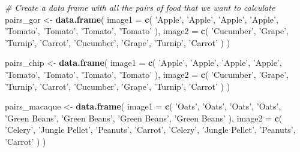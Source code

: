 \documentclass[
]{book}
\newenvironment{Shaded}{\begin{snugshade}}{\end{snugshade}}
\newcommand{\CommentTok}[1]{\textcolor[rgb]{0.56,0.35,0.01}{\textit{#1}}}
\newcommand{\DataTypeTok}[1]{\textcolor[rgb]{0.13,0.29,0.53}{#1}}
\newcommand{\KeywordTok}[1]{\textcolor[rgb]{0.13,0.29,0.53}{\textbf{#1}}}
\newcommand{\NormalTok}[1]{#1}
\newcommand{\StringTok}[1]{\textcolor[rgb]{0.31,0.60,0.02}{#1}}
\begin{document}
\begin{Shaded}
\begin{Highlighting}[]
\CommentTok{# Create a data frame with all the pairs of food that we want to calculate}
\NormalTok{pairs_gor <-}
\StringTok{  }\KeywordTok{data.frame}\NormalTok{(}
    \DataTypeTok{image1 =} \KeywordTok{c}\NormalTok{(}
      \StringTok{'Apple'}\NormalTok{,}
      \StringTok{'Apple'}\NormalTok{,}
      \StringTok{'Apple'}\NormalTok{,}
      \StringTok{'Apple'}\NormalTok{,}
      \StringTok{'Tomato'}\NormalTok{,}
      \StringTok{'Tomato'}\NormalTok{,}
      \StringTok{'Tomato'}\NormalTok{,}
      \StringTok{'Tomato'}
\NormalTok{    ),}
    \DataTypeTok{image2 =} \KeywordTok{c}\NormalTok{(}
      \StringTok{'Cucumber'}\NormalTok{,}
      \StringTok{'Grape'}\NormalTok{,}
      \StringTok{'Turnip'}\NormalTok{,}
      \StringTok{'Carrot'}\NormalTok{,}
      \StringTok{'Cucumber'}\NormalTok{,}
      \StringTok{'Grape'}\NormalTok{,}
      \StringTok{'Turnip'}\NormalTok{,}
      \StringTok{'Carrot'}
\NormalTok{    )}
\NormalTok{  )}

\NormalTok{pairs_chip <-}
\StringTok{  }\KeywordTok{data.frame}\NormalTok{(}
    \DataTypeTok{image1 =} \KeywordTok{c}\NormalTok{(}
      \StringTok{'Apple'}\NormalTok{,}
      \StringTok{'Apple'}\NormalTok{,}
      \StringTok{'Apple'}\NormalTok{,}
      \StringTok{'Apple'}\NormalTok{,}
      \StringTok{'Tomato'}\NormalTok{,}
      \StringTok{'Tomato'}\NormalTok{,}
      \StringTok{'Tomato'}\NormalTok{,}
      \StringTok{'Tomato'}
\NormalTok{    ),}
    \DataTypeTok{image2 =} \KeywordTok{c}\NormalTok{(}
      \StringTok{'Cucumber'}\NormalTok{,}
      \StringTok{'Grape'}\NormalTok{,}
      \StringTok{'Turnip'}\NormalTok{,}
      \StringTok{'Carrot'}\NormalTok{,}
      \StringTok{'Cucumber'}\NormalTok{,}
      \StringTok{'Grape'}\NormalTok{,}
      \StringTok{'Turnip'}\NormalTok{,}
      \StringTok{'Carrot'}
\NormalTok{    )}
\NormalTok{  )}


\NormalTok{pairs_macaque <-}
\StringTok{  }\KeywordTok{data.frame}\NormalTok{(}
    \DataTypeTok{image1 =} \KeywordTok{c}\NormalTok{(}
      \StringTok{'Oats'}\NormalTok{,}
      \StringTok{'Oats'}\NormalTok{,}
      \StringTok{'Oats'}\NormalTok{,}
      \StringTok{'Oats'}\NormalTok{,}
      \StringTok{'Green Beans'}\NormalTok{,}
      \StringTok{'Green Beans'}\NormalTok{,}
      \StringTok{'Green Beans'}\NormalTok{,}
      \StringTok{'Green Beans'}
\NormalTok{    ),}
    \DataTypeTok{image2 =} \KeywordTok{c}\NormalTok{(}
      \StringTok{'Celery'}\NormalTok{,}
      \StringTok{'Jungle Pellet'}\NormalTok{,}
      \StringTok{'Peanuts'}\NormalTok{,}
      \StringTok{'Carrot'}\NormalTok{,}
      \StringTok{'Celery'}\NormalTok{,}
      \StringTok{'Jungle Pellet'}\NormalTok{,}
      \StringTok{'Peanuts'}\NormalTok{,}
      \StringTok{'Carrot'}
\NormalTok{    )}
\NormalTok{  )}



\end{Highlighting}
\end{Shaded}
\end{document}
